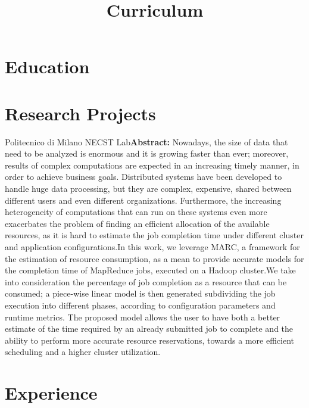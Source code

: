 \documentclass[11pt,a4paper,sans]{moderncv}        %
\title{Curriculum}                               %
\begin{document}
\makecvtitle

\section{Education}

\section{Research Projects}
	{Politecnico di Milano}
	{NECST Lab}{}{\textbf{Abstract: } Nowadays, the size of data that need to be analyzed is enormous and it is growing faster than ever; moreover, results of complex computations are expected in an increasing timely manner, in order to achieve business goals. Distributed systems have been developed to handle huge data processing, but they are complex, expensive, shared between different users and even different organizations. Furthermore, the increasing heterogeneity of computations that can run on these systems even more exacerbates the problem of finding an efficient allocation of the available resources, as it is hard to estimate the job completion time under different cluster and application configurations.In this work, we leverage MARC, a framework for the estimation of resource consumption, as a mean to provide accurate models for the completion time of MapReduce jobs, executed on a Hadoop cluster.We take into consideration the percentage of job completion as a resource that can be consumed; a piece-wise linear model is then generated subdividing the job execution into different phases, according to configuration parameters and runtime metrics. The proposed model allows the user to have both a better estimate of the time required by an already submitted job to complete and the ability to perform more accurate resource reservations, towards a more efficient scheduling and a higher cluster utilization.}
	
\section{Experience}
\end{document}
